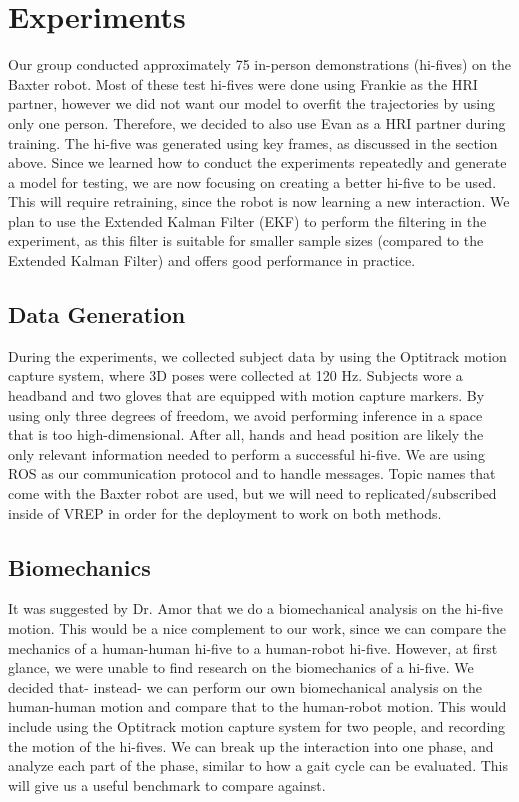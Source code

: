 \documentclass[letterpaper, 10 pt, conference]{ieeeconf}  %
\begin{document}
\section{Experiments}
\indent Our group conducted approximately 75 in-person demonstrations (hi-fives) on the Baxter robot. Most of these test hi-fives were done using Frankie as the HRI partner, however we did not want our model to overfit the trajectories by using only one person. Therefore, we decided to also use Evan as a HRI partner during training. The hi-five was generated using key frames, as discussed in the section above. Since we learned how to conduct the experiments repeatedly and generate a model for testing, we are now focusing on creating a better hi-five to be used. This will require retraining, since the robot is now learning a new interaction. We plan to use the Extended Kalman Filter (EKF) to perform the filtering in the experiment, as this filter is suitable for smaller sample sizes (compared to the Extended Kalman Filter) and offers good performance in practice.

\subsection{Data Generation}
During the experiments, we collected subject data by using the Optitrack motion capture system, where 3D poses were collected at 120 Hz. Subjects wore a headband and two gloves that are equipped with motion capture markers. By using only three degrees of freedom, we avoid performing inference in a space that is too high-dimensional. After all, hands and head position are likely the only relevant information needed to perform a successful hi-five. We are using ROS as our communication protocol and to handle messages. Topic names that come with the Baxter robot are used, but we will need to replicated/subscribed inside of VREP in order for the deployment to work on both methods.

\subsection{Biomechanics}
It was suggested by Dr. Amor that we do a biomechanical analysis on the hi-five motion. This would be a nice complement to our work, since we can compare the mechanics of a human-human hi-five to a human-robot hi-five. However, at first glance, we were unable to find research on the biomechanics of a hi-five. We decided that- instead- we can perform our own biomechanical analysis on the human-human motion and compare that to the human-robot motion. This would include using the Optitrack motion capture system for two people, and recording the motion of the hi-fives. We can break up the interaction into one phase, and analyze each part of the phase, similar to how a gait cycle can be evaluated. This will give us a useful benchmark to compare against.
\end{document}
